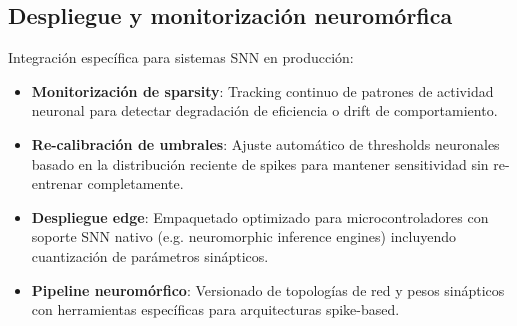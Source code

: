 \subsection{Despliegue y monitorización neuromórfica}
Integración específica para sistemas SNN en producción:
\begin{itemize}
    \item \textbf{Monitorización de sparsity}: Tracking continuo de patrones de actividad neuronal para detectar degradación de eficiencia o drift de comportamiento.
    \item \textbf{Re-calibración de umbrales}: Ajuste automático de thresholds neuronales basado en la distribución reciente de spikes para mantener sensitividad sin re-entrenar completamente.
    \item \textbf{Despliegue edge}: Empaquetado optimizado para microcontroladores con soporte SNN nativo (e.g. neuromorphic inference engines) incluyendo cuantización de parámetros sinápticos.
    \item \textbf{Pipeline neuromórfico}: Versionado de topologías de red y pesos sinápticos con herramientas específicas para arquitecturas spike-based.
\end{itemize}

